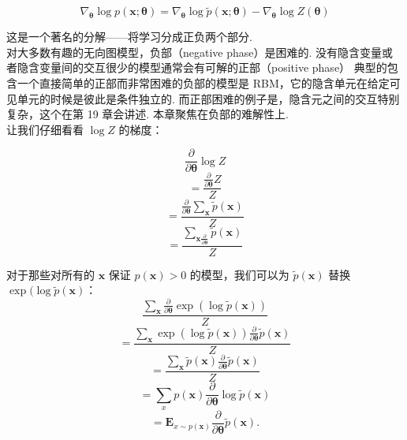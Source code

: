 \begin{equation}  \label{eq:pyth}
\nabla_{\pmb{\theta}} \log p(\mathbf{x};\pmb{\theta}) = \nabla_{\pmb{\theta}} \log \tilde{p}(\mathbf{x};\pmb{\theta}) - \nabla_{\pmb{\theta}} \log Z(\pmb{\theta})
\end{equation}

这是一个著名的分解——将学习分成正负两个部分.\\

对大多数有趣的无向图模型，负部（negative phase）是困难的. 没有隐含变量或者隐含变量间的交互很少的模型通常会有可解的正部（positive phase） 典型的包含一个直接简单的正部而非常困难的负部的模型是 RBM，它的隐含单元在给定可见单元的时候是彼此是条件独立的. 而正部困难的例子是，隐含元之间的交互特别复杂，这个在第 19 章会讲述. 本章聚焦在负部的难解性上.\\

让我们仔细看看 $\log Z$ 的梯度：

\begin{equation}  \label{eq:pyth}
\frac{\partial}{\partial \pmb{\theta}} \log Z
\end{equation}
\begin{equation}  \label{eq:pyth}
=\frac{\frac{\partial}{\partial \pmb{\theta}} Z}{Z}
\end{equation}
\begin{equation}  \label{eq:pyth}
=\frac{\frac{\partial}{\partial \pmb{\theta}} \sum_{\mathbf{x}} \tilde{p}(\mathbf{x})}{Z}
\end{equation}
\begin{equation}  \label{eq:pyth}
=\frac{\sum_{\mathbf{x} \frac{\partial}{\partial \pmb{\theta}}} \tilde{p}(\mathbf{x})}{Z}
\end{equation}

对于那些对所有的 $\mathbf{x}$ 保证 $p(\mathbf{x}) > 0$ 的模型，我们可以为 $\tilde{p}(\mathbf{x})$ 替换 $\exp(\log \tilde{p}(\mathbf{x})$：
\begin{equation}  \label{eq:pyth}
\frac{\sum_{\mathbf{x}} \frac{\partial}{\partial \pmb{\theta}} \exp(\log \tilde{p}(\mathbf{x}))}{Z}
\end{equation}
\begin{equation}  \label{eq:pyth}
=\frac{\sum_{\mathbf{x}} \exp(\log\tilde{p}(\mathbf{x})) \frac{\partial}{\partial \pmb{\theta}} \tilde{p}(\mathbf{x})}{Z}
\end{equation}
\begin{equation}  \label{eq:pyth}
=\frac{\sum_{\mathbf{x}} \tilde{p}(\mathbf{x}) \frac{\partial}{\partial \pmb{\theta}} \tilde{p}(\mathbf{x})}{Z}
\end{equation}
\begin{equation}  \label{eq:pyth}
=\sum_{x}p(\mathbf{x}) \frac{\partial}{\partial \pmb{\theta}} \log \tilde{p}(\mathbf{x})
\end{equation}
\begin{equation}  \label{eq:pyth}
=\mathbf{E}_{x\sim p(\mathbf{x})} \frac{\partial}{\partial \pmb{\theta}} \tilde{p}(\mathbf{x}).
\end{equation}

